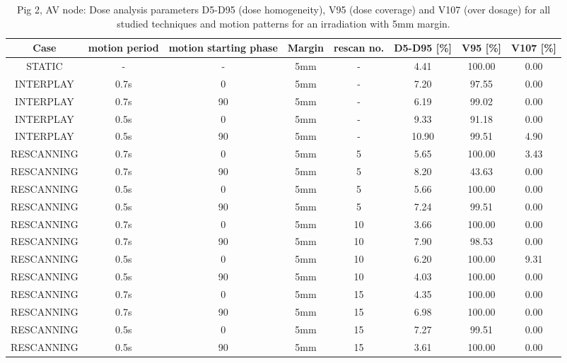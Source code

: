 \begin{table}[H]
  \centering
\tiny
  \caption{Pig 2, AV node: Dose analysis parameters D5-D95 (dose homogeneity), V95 (dose coverage) and V107 (over dosage) for all studied 
  techniques and motion patterns for an irradiation with 5mm margin.}
  \begin{tabular}{|c||c|c|c|c||c|c|c|}
    \hline\hline
    Case & motion period & motion starting phase & Margin & rescan no. & D5-D95 [\%] & V95 [\%] & V107 [\%] \\
    \hline \hline
STATIC & - & - & 5mm & - & 4.41 & 100.00 & 0.00\\
\hline \hline
INTERPLAY & 0.7s & 0 & 5mm & - & 7.20 & 97.55 & 0.00\\
INTERPLAY & 0.7s & 90 & 5mm & - & 6.19 & 99.02 & 0.00\\
INTERPLAY & 0.5s & 0 & 5mm & - & 9.33 & 91.18 & 0.00\\
INTERPLAY & 0.5s & 90 & 5mm & - & 10.90 & 99.51 & 4.90\\
\hline \hline
RESCANNING & 0.7s & 0 & 5mm & 5 & 5.65 & 100.00 & 3.43\\
RESCANNING & 0.7s & 90 & 5mm & 5 & 8.20 & 43.63 & 0.00\\
RESCANNING & 0.5s & 0 & 5mm & 5 & 5.66 & 100.00 & 0.00\\
RESCANNING & 0.5s & 90 & 5mm & 5 & 7.24 & 99.51 & 0.00\\
\hline
RESCANNING & 0.7s & 0 & 5mm & 10 & 3.66 & 100.00 & 0.00\\
RESCANNING & 0.7s & 90 & 5mm & 10 & 7.90 & 98.53 & 0.00\\
RESCANNING & 0.5s & 0 & 5mm & 10 & 6.20 & 100.00 & 9.31\\
RESCANNING & 0.5s & 90 & 5mm & 10 & 4.03 & 100.00 & 0.00\\
\hline
RESCANNING & 0.7s & 0 & 5mm & 15 & 4.35 & 100.00 & 0.00\\
RESCANNING & 0.7s & 90 & 5mm & 15 & 6.98 & 100.00 & 0.00\\
RESCANNING & 0.5s & 0 & 5mm & 15 & 7.27 & 99.51 & 0.00\\
RESCANNING & 0.5s & 90 & 5mm & 15 & 3.61 & 100.00 & 0.00\\
    \hline\hline 
  \end{tabular}
  \label{tab:Pig2_AV}
\end{table}

\newpage

